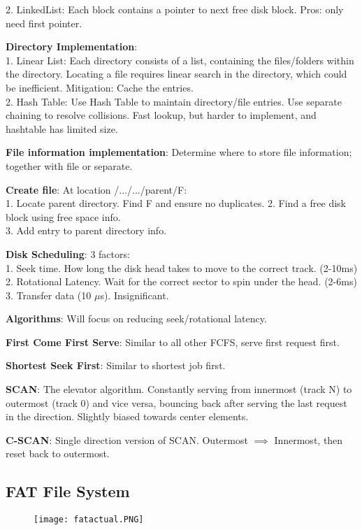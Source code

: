 \documentclass[a4paper,landscape]{article}
\newcommand{\rntopic}[1]{\vspace{-1.5em}\subsection*{#1}\vspace{-0.5em}}
\newcommand{\rnname}[1]{\textbf{#1}}
\begin{document}
\begin{multicols*}{4}
\begin{flatitemize}
2. LinkedList: Each block contains a pointer to next free disk block. Pros: only need first pointer.
\item \rnname{Directory Implementation}:\\
1. Linear List: Each directory consists of a list, containing the files/folders within the directory. Locating a file requires linear search in the directory, which could be inefficient. Mitigation: Cache the entries.\\
2. Hash Table: Use Hash Table to maintain directory/file entries. Use separate chaining to resolve collisions. Fast lookup, but harder to implement, and hashtable has limited size.
\item \rnname{File information implementation}: Determine where to store file information; together with file or separate. 
\item \rnname{Create file}: At location /.../.../parent/F: \\
1. Locate parent directory. Find F and ensure no duplicates.
2. Find a free disk block using free space info.\\
3. Add entry to parent directory info. 
\item \rnname{Disk Scheduling}: 3 factors:\\
1. Seek time. How long the disk head takes to move to the correct track. (2-10ms) \\
2. Rotational Latency. Wait for the correct sector to spin under the head. (2-6ms) \\
3. Transfer data (10 $\mu$s). Insignificant.
\item \rnname{Algorithms}: Will focus on reducing seek/rotational latency.
\item \rnname{First Come First Serve}: Similar to all other FCFS, serve first request first.
\item \rnname{Shortest Seek First}: Similar to shortest job first.
\item \rnname{SCAN}: The elevator algorithm. Constantly serving from innermost (track N) to outermost (track 0) and vice versa, bouncing back after serving the last request in the direction. Slightly biased towards center elements.
\item \rnname{C-SCAN}: Single direction version of SCAN. Outermost $\implies$ Innermost, then reset back to outermost.
\rntopic{FAT File System}
\vspace{-1.5em}
\begin{figure}[H]
  \texttt{[image: fatactual.PNG]}
\end{figure}

\end{flatitemize}
\end{multicols*}
\end{document}
